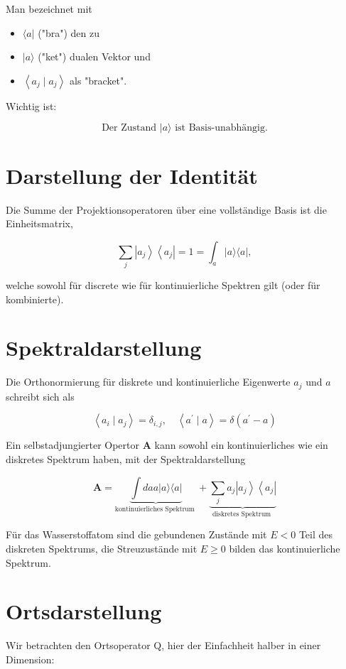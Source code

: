 \documentclass[10pt, letterpaper]{article}
\begin{document}
Man bezeichnet mit

\begin{itemize}
  \item $\langle a|$ ("bra") den zu
  \item $|a\rangle$ ("ket") dualen Vektor und
  \item $\left\langle a_{j} \mid a_{j}\right\rangle$ als "bracket".
\end{itemize}

Wichtig ist:

$$
\text { Der Zustand }|a\rangle \text { ist Basis-unabhängig. }
$$

\section*{Darstellung der Identität}
Die Summe der Projektionsoperatoren über eine vollständige Basis ist die Einheitsmatrix,

$$
\sum_{j}\left|a_{j}\right\rangle\left\langle a_{j}\right|=1=\int_{a}|a\rangle\langle a|,
$$

welche sowohl für discrete wie für kontinuierliche Spektren gilt (oder für kombinierte).

\section*{Spektraldarstellung}
Die Orthonormierung für diskrete und kontinuierliche Eigenwerte $a_{j}$ und $a$ schreibt sich als

$$
\left\langle a_{i} \mid a_{j}\right\rangle=\delta_{i, j}, \quad\left\langle a^{\prime} \mid a\right\rangle=\delta\left(a^{\prime}-a\right)
$$

Ein selbstadjungierter Opertor $\mathbf{A}$ kann sowohl ein kontinuierliches wie ein diskretes Spektrum haben, mit der Spektraldarstellung

$$
\mathbf{A}=\underbrace{\int d a a|a\rangle\langle a|}_{\text {kontinuierliches Spektrum }}+\underbrace{\sum_{j} a_{j}\left|a_{j}\right\rangle\left\langle a_{j}\right|}_{\text {diskretes Spektrum }}
$$

Für das Wasserstoffatom sind die gebundenen Zustände mit $E<0$ Teil des diskreten Spektrums, die Streuzustände mit $E \geq 0$ bilden das kontinuierliche Spektrum.

\section*{Ortsdarstellung}
Wir betrachten den Ortsoperator Q, hier der Einfachheit halber in einer Dimension:
\end{document}
